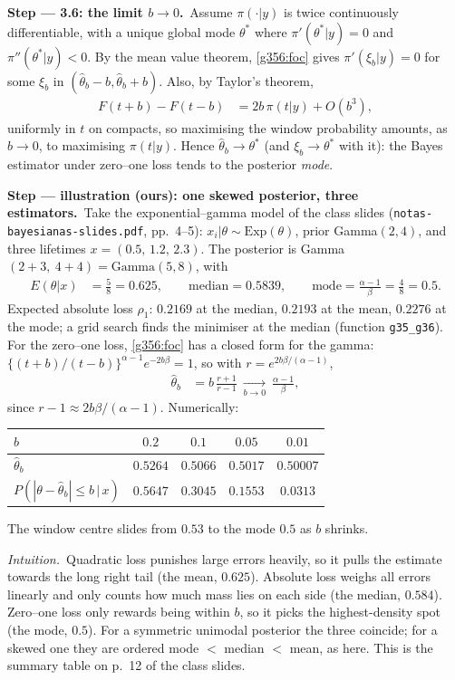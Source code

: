 \documentclass[11pt,a4paper]{article}
\newcommand{\passo}[2]{\par\smallskip\noindent\textbf{Step --- #1.}~#2}
\newcommand{\intuicao}[1]{\par\smallskip\noindent\textit{Intuition.}~#1}
\begin{document}
\begin{sol}
\passo{3.6: the limit $b\to0$}{Assume $\pi(\cdot|y)$ is twice continuously differentiable, with a unique global mode $\theta^\ast$ where $\pi'(\theta^\ast|y)=0$ and $\pi''(\theta^\ast|y)<0$. By the mean value theorem, \eqref{g356:foc} gives $\pi'(\xi_b|y)=0$ for some $\xi_b$ in $(\hat\theta_b-b,\hat\theta_b+b)$. Also, by Taylor's theorem,
\begin{align}
F(t+b)-F(t-b)&=2b\,\pi(t|y)+O(b^3),\label{g356:taylor}
\end{align}
uniformly in $t$ on compacts, so maximising the window probability amounts, as $b\to0$, to maximising $\pi(t|y)$. Hence $\hat\theta_b\to\theta^\ast$ (and $\xi_b\to\theta^\ast$ with it): the Bayes estimator under zero--one loss tends to the posterior \emph{mode}.}
\passo{illustration (ours): one skewed posterior, three estimators}{Take the exponential--gamma model of the class slides (\texttt{notas-bayesianas-slides.pdf}, pp.~4--5): $x_i|\theta\sim\text{Exp}(\theta)$, prior Gamma$(2,4)$, and three lifetimes $x=(0.5,\,1.2,\,2.3)$. The posterior is Gamma$(2+3,\ 4+4)=\text{Gamma}(5,8)$, with
\begin{align}
E(\theta|x)&=\tfrac58=0.625,\qquad\text{median}=0.5839,\qquad\text{mode}=\tfrac{\alpha-1}{\beta}=\tfrac48=0.5.\label{g356:three}
\end{align}
Expected absolute loss $\rho_1$: $0.2169$ at the median, $0.2193$ at the mean, $0.2276$ at the mode; a grid search finds the minimiser at the median (function \texttt{g35\_g36}). For the zero--one loss, \eqref{g356:foc} has a closed form for the gamma: $\{(t+b)/(t-b)\}^{\alpha-1}e^{-2b\beta}=1$, so with $r=e^{2b\beta/(\alpha-1)}$,
\begin{align}
\hat\theta_b&=b\,\frac{r+1}{r-1}\ \xrightarrow[b\to0]{}\ \frac{\alpha-1}{\beta},\label{g356:cf}
\end{align}
since $r-1\approx2b\beta/(\alpha-1)$. Numerically:
\begin{center}\small
\begin{tabular}{lcccc}
\toprule
$b$ & $0.2$ & $0.1$ & $0.05$ & $0.01$\\
\midrule
$\hat\theta_b$ & $0.5264$ & $0.5066$ & $0.5017$ & $0.50007$\\
$P(|\theta-\hat\theta_b|\le b\,|\,x)$ & $0.5647$ & $0.3045$ & $0.1553$ & $0.0313$\\
\bottomrule
\end{tabular}
\end{center}
The window centre slides from $0.53$ to the mode $0.5$ as $b$ shrinks.}
\intuicao{Quadratic loss punishes large errors heavily, so it pulls the estimate towards the long right tail (the mean, $0.625$). Absolute loss weighs all errors linearly and only counts how much mass lies on each side (the median, $0.584$). Zero--one loss only rewards being within $b$, so it picks the highest-density spot (the mode, $0.5$). For a symmetric unimodal posterior the three coincide; for a skewed one they are ordered mode $<$ median $<$ mean, as here. This is the summary table on p.~12 of the class slides.}

\end{sol}
\end{document}
